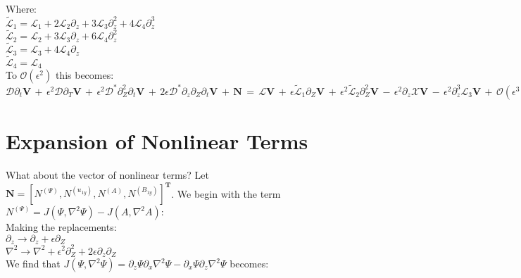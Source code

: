 \documentclass[letterpaper,12pt]{article}
\begin{document}
Where: \\

$\widetilde{\mathcal{L}}_1 = \mathcal{L}_1 + 2\mathcal{L}_2\partial_z + 3\mathcal{L}_3\partial_z^2 + 4\mathcal{L}_4\partial_z^3$ \\

$\widetilde{\mathcal{L}}_2 = \mathcal{L}_2 + 3\mathcal{L}_3\partial_z + 6\mathcal{L}_4\partial_z^2$ \\

$\widetilde{\mathcal{L}}_3 = \mathcal{L}_3 + 4\mathcal{L}_4\partial_z$ \\

$\widetilde{\mathcal{L}}_4 = \mathcal{L}_4$ \\

To $\mathcal{O}(\epsilon^2)$ this becomes: \\

$\mathcal{D}\partial_t\mathbf{V} \, + \, \epsilon^2  \mathcal{D}\partial_T\mathbf{V} \, + \, \epsilon^2\mathcal{D^*}\partial_Z^2\partial_t\mathbf{V} \, + \, 2\epsilon\mathcal{D^*}\partial_z\partial_Z\partial_t\mathbf{V} \, + \, \mathbf{N} \, = \, \mathcal{L}\mathbf{V} \, + \, \epsilon\widetilde{\mathcal{L}}_1\partial_Z\mathbf{V} \, + \, \epsilon^2\widetilde{\mathcal{L}}_2\partial_Z^2\mathbf{V} \, - \, \epsilon^2\partial_z\mathcal{X}\mathbf{V} \, - \, \epsilon^2\partial_z^3\mathcal{L}_3\mathbf{V} \, + \, \mathcal{O}(\epsilon^3)$ \\

\section*{Expansion of Nonlinear Terms}

What about the vector of nonlinear terms? Let $\mathbf{N} = \left[N^{\left(\Psi\right)}, N^{\left(u_{1y}\right)}, N^{\left(A\right)}, N^{\left(B_{1y}\right)} \right]^\mathbf{T}$. We begin with the term $N^{\left(\Psi\right)} = J\left(\Psi, \nabla^2\Psi\right) - J\left(A, \nabla^2A\right)$: \\

Making the replacements: \\

$\partial_z \to \partial_z + \epsilon\partial_Z$ \\

$\nabla^2 \to \nabla^2 + \epsilon^2\partial_Z^2 + 2\epsilon\partial_z\partial_Z$ \\

We find that $J\left(\Psi, \nabla^2\Psi\right) = \partial_z\Psi\partial_x\nabla^2\Psi - \partial_x\Psi\partial_z\nabla^2\Psi$ becomes: \\
\end{document}
